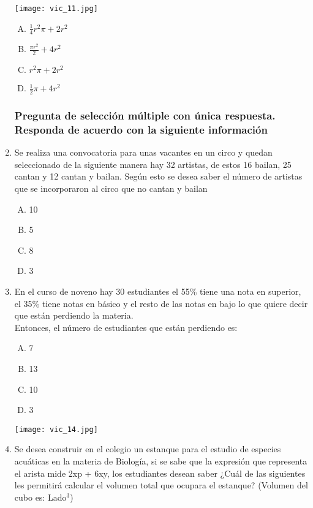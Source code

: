 \begin{enumerate}
\texttt{[image: vic\_11.jpg]} 

\begin{enumerate}[(A)]
\item $\frac{1}{4}r^2\pi+2r^2$
\item $\frac{\pi r^2}{2}+4r^2$
\item $r^2\pi+2r^2$
\item $\frac{1}{2}\pi+4r^2$
\end{enumerate}

\newpage
\subsubsection*{Pregunta de selección múltiple con única respuesta. Responda de acuerdo con la siguiente información}
\item Se realiza una convocatoria para unas vacantes en un circo y quedan seleccionado de la siguiente manera  hay 32 artistas, de estos 16 bailan, 25 cantan y 12 cantan y bailan. Según esto se desea saber el número de artistas que se incorporaron al circo que  no  cantan y bailan \label{anexo_conjuntos}\label{vic-12} 

\begin{enumerate}[(A)]
\item 10
\item 5
\item 8
\item 3
\end{enumerate}
\item En el curso de noveno  hay 30 estudiantes el 55\% tiene una nota en superior, el 35\% tiene notas en básico y el resto de las notas en bajo lo que quiere decir que están perdiendo la materia. \\ Entonces, el número de  estudiantes que están perdiendo es:\label{vic-13}
\begin{enumerate}[(A)]
\item 7
\item 13
\item 10
\item 3
\end{enumerate}

\newpage
\texttt{[image: vic\_14.jpg]} 

\item Se desea construir en el colegio un estanque para el estudio de especies acuáticas en la materia de Biología, si se sabe que  la expresión que representa el arista mide 2xp + 6xy, los estudiantes desean saber ¿Cuál de las siguientes les permitirá calcular el volumen total que ocupara el estanque? (Volumen del cubo es: Lado$^3$)\label{vic-14}



\end{enumerate}
